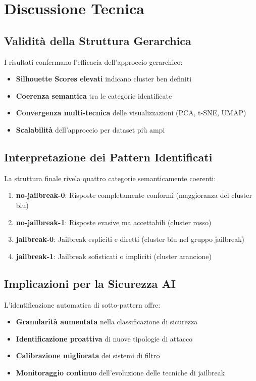 \documentclass[12pt,a4paper]{article}
\begin{document}
\section{Discussione Tecnica}

\subsection{Validità della Struttura Gerarchica}

I risultati confermano l'efficacia dell'approccio gerarchico:
\begin{itemize}
    \item \textbf{Silhouette Scores elevati} indicano cluster ben definiti
    \item \textbf{Coerenza semantica} tra le categorie identificate
    \item \textbf{Convergenza multi-tecnica} delle visualizzazioni (PCA, t-SNE, UMAP)
    \item \textbf{Scalabilità} dell'approccio per dataset più ampi
\end{itemize}

\subsection{Interpretazione dei Pattern Identificati}

La struttura finale rivela quattro categorie semanticamente coerenti:
\begin{enumerate}
    \item \textbf{no-jailbreak-0}: Risposte completamente conformi (maggioranza del cluster blu)
    \item \textbf{no-jailbreak-1}: Risposte evasive ma accettabili (cluster rosso)
    \item \textbf{jailbreak-0}: Jailbreak espliciti e diretti (cluster blu nel gruppo jailbreak)
    \item \textbf{jailbreak-1}: Jailbreak sofisticati o impliciti (cluster arancione)
\end{enumerate}

\subsection{Implicazioni per la Sicurezza AI}

L'identificazione automatica di sotto-pattern offre:
\begin{itemize}
    \item \textbf{Granularità aumentata} nella classificazione di sicurezza
    \item \textbf{Identificazione proattiva} di nuove tipologie di attacco
    \item \textbf{Calibrazione migliorata} dei sistemi di filtro
    \item \textbf{Monitoraggio continuo} dell'evoluzione delle tecniche di jailbreak
\end{itemize}
\end{document}
